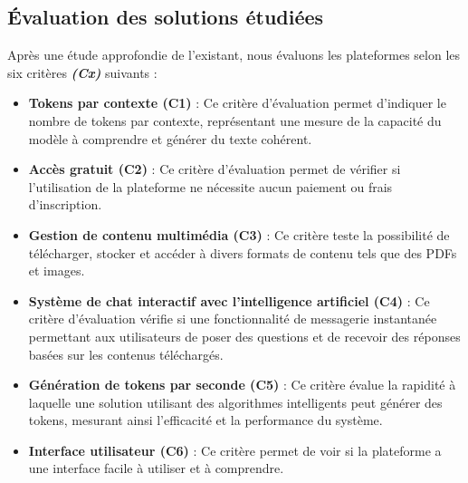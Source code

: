 \subsection{Évaluation des solutions étudiées}
Après une étude approfondie de l’existant, nous évaluons les plateformes selon les six critères \textbf{\textit{(Cx)}} suivants :
\begin{itemize}[itemsep=2pt, parsep=2pt]
    \item \textbf{Tokens par contexte (C1)} : Ce critère d’évaluation permet d’indiquer le nombre de tokens par contexte, représentant une mesure de la capacité du modèle à comprendre et générer du texte cohérent.
    \item \textbf{Accès gratuit (C2)} : Ce critère d’évaluation permet de vérifier si l'utilisation de la plateforme ne nécessite aucun paiement ou frais d'inscription.
    \item \textbf{Gestion de contenu multimédia (C3)} : Ce critère teste la possibilité de télécharger, stocker et accéder à divers formats de contenu tels que des PDFs et images.
    \item \textbf{Système de chat interactif avec l’intelligence artificiel (C4)} : Ce critère d’évaluation vérifie si une fonctionnalité de messagerie instantanée permettant aux utilisateurs de poser des questions et de recevoir des réponses basées sur les contenus téléchargés.
    \item \textbf{Génération de tokens par seconde (C5)} : Ce critère évalue la rapidité à laquelle une solution utilisant des algorithmes intelligents peut générer des tokens, mesurant ainsi l'efficacité et la performance du système.
    \item \textbf{Interface utilisateur (C6)} : Ce critère permet de voir si la plateforme a une interface facile à utiliser et à comprendre.
\end{itemize}

